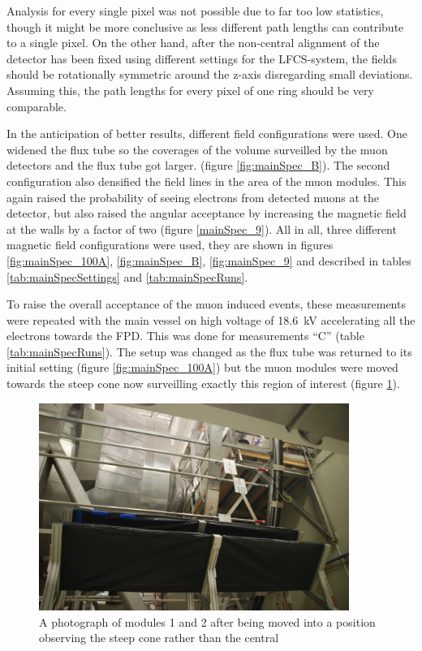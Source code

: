   Analysis for every single pixel was not possible due to far too low statistics, though it might be more conclusive as less different path lengths can contribute to a single pixel. On the other hand, after the non-central alignment of the detector has been fixed using different settings for the LFCS-system, the fields should be rotationally symmetric around the z-axis disregarding small deviations. Assuming this, the path lengths for every pixel of one ring should be very comparable.
  
  
  In the anticipation of better results, different field configurations were used. One widened the flux tube so the coverages of the volume surveilled by the muon detectors and the flux tube got larger. (figure \ref{fig:mainSpec_B}). The second configuration also densified the field lines in the area of the muon modules. This again raised the probability of seeing electrons from detected muons at the detector, but also raised the angular acceptance by increasing the magnetic field at the walls by a factor of two (figure \ref{mainSpec_9}).
  All in all, three different magnetic field configurations were used, they are shown in figures \ref{fig:mainSpec_100A}, \ref{fig:mainSpec_B}, \ref{fig:mainSpec_9} and described in tables \ref{tab:mainSpecSettings} and \ref{tab:mainSpecRuns}.
  
	
  To raise the overall acceptance of the muon induced events, these measurements were repeated with the main vessel on high voltage of \SI{18.6}{\kilo\volt} accelerating all the electrons towards the FPD.
  This was done for measurements ``C'' (table \ref{tab:mainSpecRuns}). The setup was changed as the flux tube was returned to its initial setting (figure \ref{fig:mainSpec_100A}) but the muon modules were moved towards the steep cone now surveilling exactly this region of interest (figure \ref{fig:12steepCone}).
  
  \begin{figure}
  	\centering
  	\includegraphics[width = 0.9\textwidth]{graphics/muonModules/mainSpec/12steepCone.jpg}
  	\caption[Modules 1\& 2 at steep cone]{A photograph of modules 1 and 2 after being moved into a position observing the steep cone rather than the central }
  	\label{fig:12steepCone}
  \end{figure}

